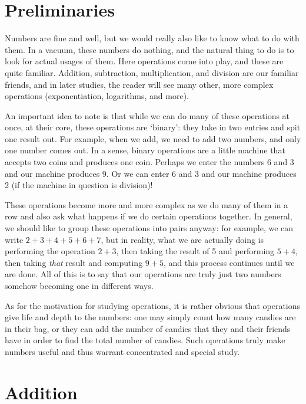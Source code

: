 \documentclass[openany]{book}
\begin{document}
\section{Preliminaries}
Numbers are fine and well, but we would really also like to know what to do with them. In a vacuum, these numbers do nothing, and the natural thing to do is to look for actual usages of them. Here operations come into play, and these are quite familiar. Addition, subtraction, multiplication, and division are our familiar friends, and in later studies, the reader will see many other, more complex operations (exponentiation, logarithms, and more).\par
An important idea to note is that while we can do many of these operations at once, at their core, these operations are `binary': they take in two entries and spit one result out. For example, when we add, we need to add two numbers, and only one number comes out. In a sense, binary operations are a little machine that accepts two coins and produces one coin. Perhaps we enter the numbers 6 and 3 and our machine produces 9. Or we can enter 6 and 3 and our machine produces 2 (if the machine in question is division)!\par
These operations become more and more complex as we do many of them in a row and also ask what happens if we do certain operations together. In general, we should like to group these operations into pairs anyway: for example, we can write $2+3+4+5+6+7$, but in reality, what we are actually doing is performing the operation $2+3$, then taking the result of 5 and performing $5+4$, then taking \textit{that} result and computing $9+5$, and this process continues until we are done. All of this is to say that our operations are truly just two numbers somehow becoming one in different ways.\par
As for the motivation for studying operations, it is rather obvious that operations give life and depth to the numbers: one may simply count how many candies are in their bag, or they can add the number of candies that they and their friends have in order to find the total number of candies. Such operations truly make numbers useful and thus warrant concentrated and special study.
\section{Addition}
\end{document}
